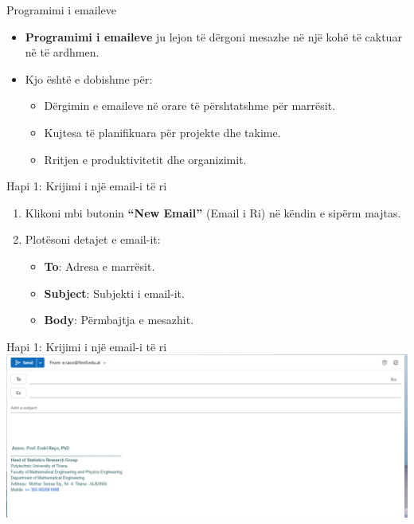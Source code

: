\documentclass[
  ignorenonframetext,
]{beamer}
\begin{document}
\begin{frame}{Programimi i emaileve}
\label{programimi-i-emaileve}
\begin{itemize}
\item
  \textbf{Programimi i emaileve} ju lejon të dërgoni mesazhe në një kohë
  të caktuar në të ardhmen.
\item
  Kjo është e dobishme për:

  \begin{itemize}
  \item
    Dërgimin e emaileve në orare të përshtatshme për marrësit.
  \item
    Kujtesa të planifikuara për projekte dhe takime.
  \item
    Rritjen e produktivitetit dhe organizimit.
  \end{itemize}
\end{itemize}
\end{frame}

\begin{frame}{Hapi 1: Krijimi i një email-i të ri}
\label{hapi-1-krijimi-i-njuxeb-email-i-tuxeb-ri}
\begin{enumerate}
\item
  Klikoni mbi butonin \textbf{``New Email''} (Email i Ri) në këndin e
  sipërm majtas.
\item
  Plotësoni detajet e email-it:

  \begin{itemize}
  \item
    \textbf{To}: Adresa e marrësit.
  \item
    \textbf{Subject}: Subjekti i email-it.
  \item
    \textbf{Body}: Përmbajtja e mesazhit.
  \end{itemize}
\end{enumerate}
\end{frame}

\begin{frame}{Hapi 1: Krijimi i një email-i të ri}
\label{hapi-1-krijimi-i-njuxeb-email-i-tuxeb-ri-1}
\includegraphics{./images/outlook31.png}
\end{frame}
\end{document}
